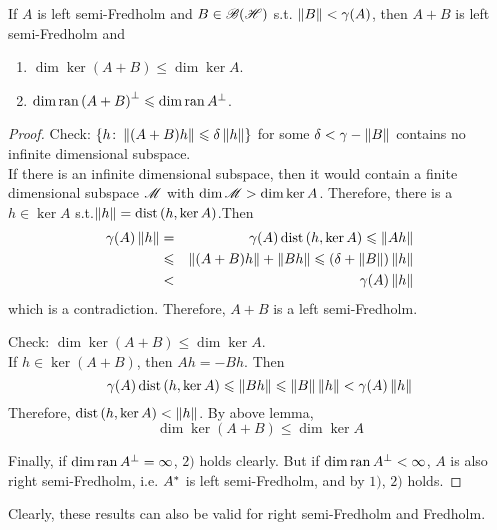 \documentclass[a4paper,11pt]{report}
\begin{document}
\begin{lem}
	If $A$ is left semi-Fredholm and $B \in \mathscr{B(H)}$ s.t. $\left\lVert B\right\lVert < \gamma(A)$, then $A+B$ is left semi-Fredholm and 
	\begin{enumerate}[label=\arabic*)]
		\item $\dim{\ker{(A+B)}} \leqslant \dim{\ker{A}}$.
		\item $\dim{\operatorname{ran}{(A+B)}^{\bot}} \leqslant \dim{\operatorname{ran}{A}^{\bot}}$.
	\end{enumerate}
\end{lem}
\begin{proof}
	Check: $\{h \colon \left\lVert(A+B)h\right\lVert \leqslant \delta \left\lVert h\right\lVert\}$ for some $\delta < \gamma - \left\lVert B\right\lVert$ contains no infinite dimensional subspace. \\
	If there is an infinite dimensional subspace, then it would contain a finite dimensional subspace $\mathscr{M}$ with $\dim{\mathscr{M}} > \dim{\ker{A}}$. Therefore, there is a $h \in \ker{A}$ s.t.$\left\lVert h\right\lVert = \operatorname{dist}{(h,\ker{A})}$.Then
	\begin{eqnarray*}
		\gamma(A)\left\lVert h\right\lVert &=& \gamma(A) \operatorname{dist}{(h,\ker{A})} \leqslant \left\lVert Ah\right\lVert \\
		&\leqslant& \left\lVert(A+B)h\right\lVert +\left\lVert Bh\right\lVert \leqslant (\delta+\left\lVert B\right\lVert)\left\lVert h\right\lVert \\
		&<& \gamma(A)\left\lVert h\right\lVert
	\end{eqnarray*}
	which is a contradiction. Therefore, $A+B$ is a left semi-Fredholm.

	\item Check: $\dim{\ker{(A+B)}} \leqslant \dim{\ker{A}}$. \\
	If $h \in \ker{(A+B)}$, then $Ah = -Bh$. Then
	\begin{equation*}
		\gamma(A)\operatorname{dist}{(h,\ker{A})} \leqslant \left\lVert Bh\right\lVert \leqslant \left\lVert B\right\lVert\left\lVert h\right\lVert < \gamma(A) \left\lVert h\right\lVert
	\end{equation*}
	Therefore, $\operatorname{dist}{(h,\ker{A})} < \left\lVert h\right\lVert$. By above lemma,
	\begin{equation*}
		\dim{\ker{(A+B)}} \leqslant \dim{\ker{A}}
	\end{equation*}

	\item Finally, if $\dim{\operatorname{ran}{A}^{\bot}} = \infty$, $2)$ holds clearly. But if $\dim{\operatorname{ran}{A}^{\bot}} < \infty$, $A$ is also right semi-Fredholm, i.e. $A^{*}$ is left semi-Fredholm, and by $1)$, $2)$ holds.
\end{proof}
\begin{rem}
	Clearly, these results can also be valid for right semi-Fredholm and Fredholm.
\end{rem}
\end{document}
